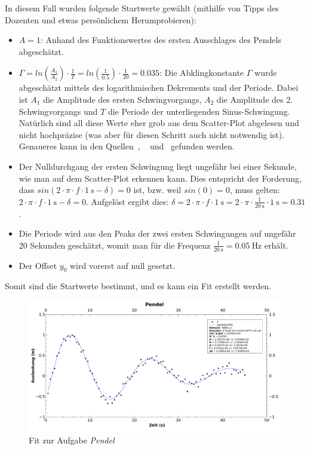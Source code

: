 In diesem  Fall wurden folgende  Startwerte gew\"ahlt (mithilfe von  Tipps des
Dozenten und etwas pers\"onlichem Herumprobieren):
\begin{itemize}
    \item
        $A = 1$: Anhand des Funktionswertes des ersten Ausschlages des Pendels
        abgesch\"atzt.
    \item
        $\Gamma  =  ln  \left(\frac{A_1}{A_2}   \right)  \cdot  \frac{1}{T}  =
        ln  \left(\frac{1}{0.5}   \right)  \cdot   \frac{1}{20}  =   0.035  $:
        Die   Abklingkonstante  $\Gamma$   wurde  abgesch\"atzt   mittels  des
        logarithmischen   Dekrements   und   der  Periode. Dabei   ist   $A_1$
        die  Amplitude   des  ersten  Schwingvorgangs,  $A_2$   die  Amplitude
        des  2. Schwingvorgangs   und  $T$  die  Periode   der  unterliegenden
        Sinus-Schwingung. Nat\"urlich   sind  all   diese   Werte  eher   grob
        aus   dem  Scatter-Plot   abgelesen  und   nicht  hochpr\"azise   (was
        aber  f\"ur  diesen  Schritt   auch  nicht  notwendig  ist). Genaueres
        kann     in     den     Quellen~\cite{ref:wikipedia:abklingkonstante},
        ~\cite{ref:wikipedia:periode}   und~\cite{ref:wikipedia:logarithmDekr}
        gefunden werden.
    \item
        Der  Nulldurchgang der  ersten Schwingung  liegt ungef\"ahr  bei einer
        Sekunde, wie  man auf dem Scatter-Plot  erkennen kann. Dies entspricht
        der Forderung, dass  $sin(2 \cdot \pi \cdot f  \cdot \SI{1}{\second} -
        \delta) = 0$ ist,  bzw. weil $sin(0) = 0$, muss  gelten:  $2 \cdot \pi
        \cdot f \cdot \SI{1}{\second} -  \delta = 0$. Aufgel\"ost ergibt dies:
        $\delta =  2 \cdot  \pi \cdot  f \cdot \SI{1}{\second}  = 2  \cdot \pi
        \cdot \frac{1}{\SI{20}{\second}} \cdot \SI{1}{\second} = 0.31$.
    \item
        Die  Periode wird  aus  den  Peaks der  zwei  ersten Schwingungen  auf
        ungef\"ahr  20  Sekunden gesch\"atzt,  womit  man  f\"ur die  Frequenz
        $\frac{1}{\SI{20}{\second}} = \SI{0.05}{\hertz}$ erh\"alt.
    \item
        Der Offset $y_0$ wird vorerst auf null gesetzt.
\end{itemize}

Somit sind die Startwerte bestimmt, und es kann ein Fit erstellt werden.

\begin{figure}[th!]
    \centering
    \includegraphics[width=\textwidth]{images/aufgabe4.pdf}
    \caption{Fit zur Aufgabe \emph{Pendel}}
    \label{fig:gauss}
\end{figure}
